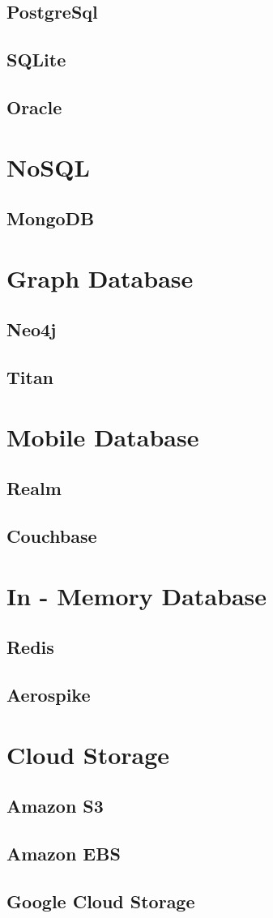 \subsection{PostgreSql}
\subsection{SQLite}
\subsection{Oracle}

\section{NoSQL}
\subsection{MongoDB}

\section{Graph Database}

\subsection{Neo4j}
\subsection{Titan}

\section{Mobile Database}

\subsection{Realm}
\subsection{Couchbase}

\section{In - Memory Database}

\subsection{Redis}
\subsection{Aerospike}

\section{Cloud Storage}

\subsection{Amazon S3}
\subsection{Amazon EBS}
\subsection{Google Cloud Storage}